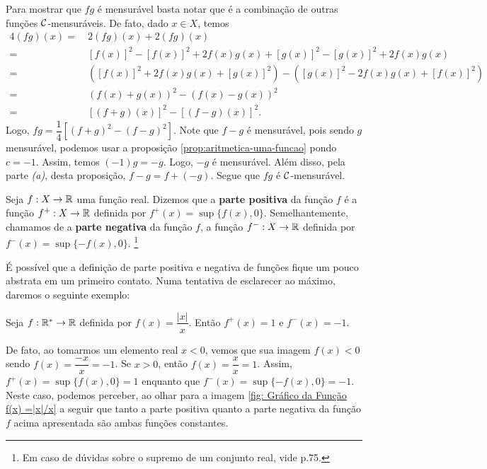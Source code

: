 \begin{prova}
    Para mostrar que $fg$ é mensurável basta notar que é a combinação de outras funções $\operatorname{\mathcal{C}}$-mensuráveis.
    De fato, dado $x \in X$, temos
	    \begin{align*}
	        4(fg)(x) 
	        =& \ 2(fg)(x) +  2(fg)(x)\\
	        =& \ [f(x)]^2 - [f(x)]^2 + 2f(x)g(x) + [g(x)]^2 - [g(x)]^2 + 2f(x)g(x)\\
	        =& \ \left([f(x)]^2 + 2f(x)g(x) + [g(x)]^2\right)  - \left([g(x)]^2 - 2f(x)g(x) + [f(x)]^2\right)\\
	        =& \ (f(x) +g(x))^2 - (f(x) - g(x))^2\\
	        =& \ [(f+g)(x)]^2 - [(f-g)(x)]^2.
	    \end{align*}
    Logo, $fg = \dfrac{1}{4}\left[(f+g)^2 - (f-g)^2\right]$.
    Note que  $f-g$ é mensurável, pois sendo $g$ mensurável, podemos usar a proposição \ref{prop:aritmetica-uma-funcao} pondo $c= -1$.
    Assim, temos $(-1)g = -g$. Logo, $-g$ é mensurável.
    Além disso, pela parte \textit{(a)}, desta proposição, $f - g = f+ (-g)$.
    Segue que $fg$ é $\operatorname{\mathcal{C}}$-mensurável.
\end{prova}

\begin{definition}
	\label{def:parte-positiva e negativa}
    Seja $f: X \to \mathbb{R}$ uma função real. Dizemos que a \textbf{parte positiva} da função $f$ é a função $f^+: X \to \mathbb{R}$ definida por $f^+(x) = \sup\{f(x), 0\}$.
    Semelhantemente, chamamos de a \textbf{parte negativa} da função $f$, a função $f^-: X \to \mathbb{R}$ definida por $f^-(x) = \sup\{-f(x), 0\}$.
    \footnote{Em caso de dúvidas sobre o supremo de um conjunto real, vide \supercite{elon}{p.75}.}
\end{definition}

É possível  que a definição de parte positiva e negativa de funções fique um pouco abstrata em um primeiro contato. 
Numa tentativa de esclarecer ao máximo, daremos o seguinte exemplo:
\begin{example}
    Seja $f: \mathbb{R}^* \to \mathbb{R}$ definida por $f(x) =\dfrac{|x|}{x}$. 
    Então $f^+(x) = 1$ e $f^-(x) = -1$.
\end{example}

De fato, ao tomarmos um elemento real $x< 0$, vemos que sua imagem $f(x) < 0$ sendo $f(x) = \dfrac{-x}{x} = -1$.
Se $x>0$, então $f(x) =\dfrac{x}{x} = 1$. 
Assim, $f^+(x) = \sup\{f(x), 0\} = 1$ enquanto que $f^-(x) = \sup\{-f(x), 0\} = -1$.
Neste caso, podemos perceber, ao olhar para a imagem \ref{fig: Gráfico da Função f(x) =|x|/x} a seguir que tanto a parte positiva quanto a parte negativa da função $f$ acima apresentada são ambas funções constantes.\\

